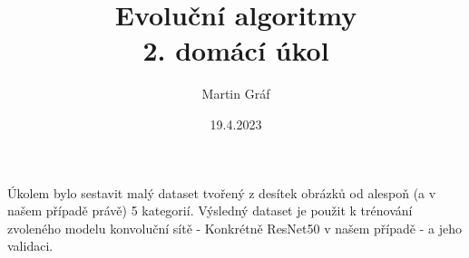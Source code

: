 \documentclass[a4paper]{article}
\begin{document}
 
 
\title{ Evoluční algoritmy \\ 2. domácí úkol
        } 
\author{Martin Gráf}
\date{19.4.2023}

\maketitle

Úkolem bylo sestavit malý dataset tvořený z desítek obrázků od alespoň (a v našem případě právě) 5 kategorií. Výsledný dataset je použit k trénování zvoleného modelu konvoluční sítě - Konkrétně ResNet50 v našem případě - a jeho validaci.
\end{document}
